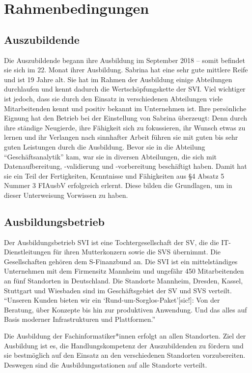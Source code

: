\chapter{Rahmenbedingungen}

\section{Auszubildende}
Die Auszubildende \Azubi begann ihre Ausbildung im September 2018 -- somit befindet sie sich im 22. Monat ihrer Ausbildung. Sabrina hat eine sehr gute mittlere Reife und ist 19 Jahre alt. Sie hat im Rahmen der Ausbildung einige Abteilungen durchlaufen und kennt dadurch die Wertschöpfungskette der \ac{SVI}. Viel wichtiger ist jedoch, dass sie durch den Einsatz in verschiedenen Abteilungen viele Mitarbeitenden kennt und positiv bekannt im Unternehmen ist. Ihre persönliche Eignung hat den Betrieb bei der Einstellung von Sabrina überzeugt: Denn durch ihre ständige Neugierde, ihre Fähigkeit sich zu fokussieren, ihr Wunsch etwas zu lernen und ihr Verlangen nach sinnhafter Arbeit führen sie mit guten bis sehr guten Leistungen durch die Ausbildung. Bevor sie in die Abteilung \enquote{Geschäftsanalytik} kam, war sie in diversen Abteilungen, die sich mit Datenaufbereitung, -validierung und -vorbereitung beschäftigt haben. Damit hat sie ein Teil der Fertigkeiten, Kenntnisse und Fähigkeiten aus §4 Absatz 5 Nummer 3 \ac{FIAusbV} erfolgreich erlernt. Diese bilden die Grundlagen, um in dieser Unterweisung Vorwissen zu haben. 

\section{Ausbildungsbetrieb}
Der Ausbildungsbetrieb \ac{SVI} ist eine Tochtergesellschaft der \ac{SV}, die die IT-Dienstleitungen für ihren Mutterkonzern sowie die \ac{SVS} übernimmt. Die Gesellschaften gehören dem S-Finanzbund an. Die \ac{SVI} ist ein mittelständiges Unternehmen mit dem Firmensitz Mannheim und ungefähr 450 Mitarbeitenden\autocite[vgl.][]{sv_informatik_gmbg_uber_2020} an fünf Standorten in Deutschland. Die Standorte Mannheim, Dresden, Kassel, Stuttgart und Wiesbaden sind im Geschäftsgebiet der \ac{SV} und \ac{SVS} verteilt. \enquote{Unseren Kunden bieten wir ein \enquote{Rund-um-Sorglos-Paket}[sic!]: Von der Beratung, über Konzepte bis hin zur produktiven Anwendung. Und das alles auf Basis moderner Infrastrukturen und Plattformen.}\autocite{sv_informatik_gmbg_uber_2020}
\par
Die Ausbildung der Fachinformatiker*innen erfolgt an allen Standorten. Ziel der Ausbildung ist es, die Handlungskompetenz der Auszubildenden zu fördern und sie bestmöglich auf den Einsatz an den verschiedenen Standorten vorzubereiten. Deswegen sind die Ausbildungsstationen auf alle Standorte verteilt.

